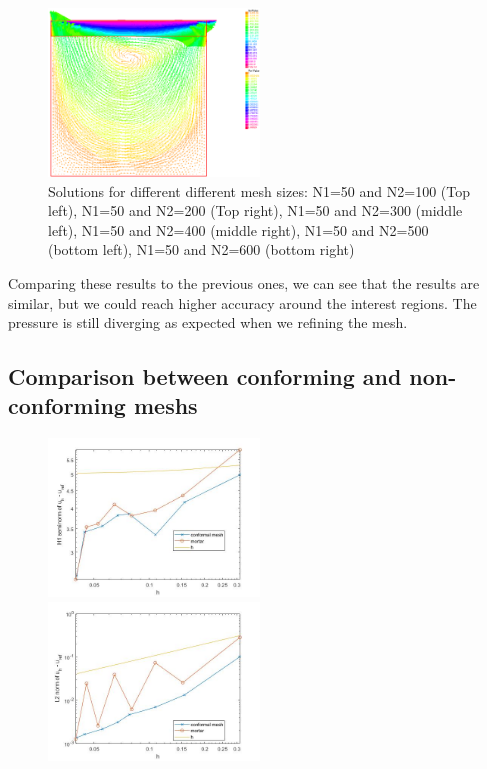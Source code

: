 \documentclass{article}
\begin{document}
\begin{figure}[h]
	\includegraphics[width=0.5\textwidth]{imgs/solution_600_50.PNG}
	\caption{Solutions for different different mesh sizes: N1=50 and N2=100 (Top left), N1=50 and N2=200 (Top right), N1=50 and N2=300 (middle left), N1=50 and N2=400 (middle right), N1=50 and N2=500 (bottom left), N1=50 and N2=600 (bottom right)}
    \label{fig:Meshes}
\end{figure}
Comparing these results to the previous ones, we can see that the results are
similar, but we could reach higher accuracy around the interest regions. The
pressure is still diverging as expected when we refining the mesh.

\subsection*{Comparison between conforming and non-conforming meshs}
\begin{figure}
	\includegraphics[width=0.5\textwidth]{imgs/errH1.jpg}
	\includegraphics[width=0.5\textwidth]{imgs/errL2.jpg}
\end{figure}
\end{document}
